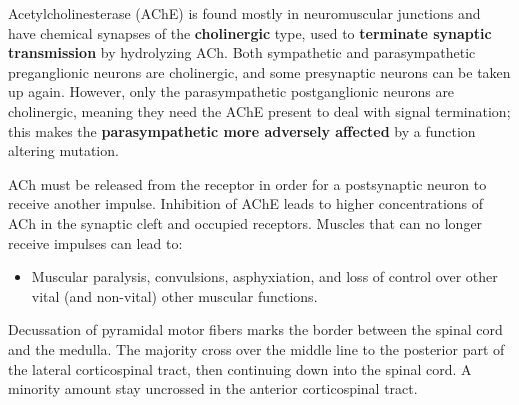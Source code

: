 \documentclass[basic]{inVerba-notes}
\begin{document}
\begin{enumerate} 

  Acetylcholinesterase (AChE) is found mostly in neuromuscular junctions and have chemical synapses of the \textbf{cholinergic} type, used to \textbf{terminate synaptic transmission} by hydrolyzing ACh. Both sympathetic and parasympathetic preganglionic neurons are cholinergic, and some presynaptic neurons can be taken up again. However, only the parasympathetic postganglionic neurons are cholinergic, meaning they need the AChE present to deal with signal termination; this makes the \textbf{parasympathetic more adversely affected} by a function altering mutation.
  

  ACh must be released from the receptor in order for a postsynaptic neuron to receive another impulse. Inhibition of AChE leads to higher concentrations of ACh in the synaptic cleft and occupied receptors. Muscles that can no longer receive impulses can lead to:

  \begin{itemize}
    \item Muscular paralysis, convulsions, asphyxiation, and loss of control over other vital (and non-vital) other muscular functions.
  \end{itemize}
  

  Decussation of pyramidal motor fibers marks the border between the spinal cord and the medulla. The majority cross over the middle line to the posterior part of the lateral corticospinal tract, then continuing down into the spinal cord. A minority amount stay uncrossed in the anterior corticospinal tract. 


\end{enumerate}
\end{document}
